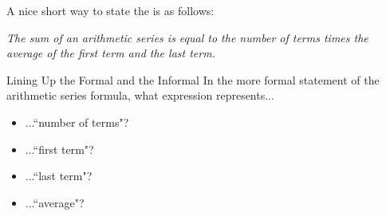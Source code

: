 A nice short way to state the  is as follows: 
\begin{center}
\emph{The sum of an arithmetic series is equal to the number of terms times the average of the first term and the last term.}\end{center}

\begin{exercise}{Lining Up the Formal and the Informal \Coffeecup}
In the more formal statement of the arithmetic series formula, what expression represents... 
\begin{itemize}
\item ...``number of terms"?
\item ...``first term"?
\item ...``last term"?
\item ...``average"?
\end{itemize}
\end{exercise}

